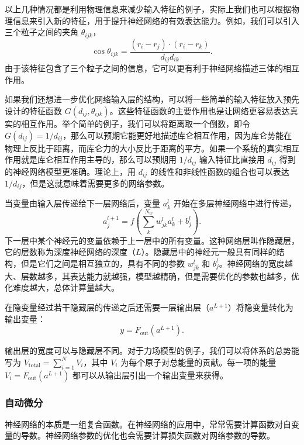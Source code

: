 以上几种情况都是利用物理信息来减少输入特征的例子，实际上我们也可以根据物理信息来引入新的特征，用于提升神经网络的有效表达能力。例如，我们可以引入三个粒子之间的夹角 $\theta_{ijk}$，
\[
\cos\theta_{ijk}=\frac{(r_i-r_j)\cdot(r_i-r_k)}{d_{ij}d_{ik}}.
\]
由于该特征包含了三个粒子之间的信息，它可以更有利于神经网络描述三体的相互作用。

如果我们还想进一步优化网络输入层的结构，可以将一些简单的输入特征放入预先设计的特征函数 $G(d_{ij},\theta_{ijk})$。这些特征函数的主要作用也是让网络更容易表达真实的相互作用。举个简单的例子，我们可以将距离取一个倒数，即令 $G(d_{ij})=1/d_{ij}$，那么可以预期它能更好地描述库仑相互作用，因为库仑势能在物理上反比于距离，而库仑力的大小反比于距离的平方。如果一个系统的真实相互作用就是库仑相互作用主导的，那么可以预期用 $1/d_{ij}$ 输入特征比直接用 $d_{ij}$ 得到的神经网络模型更准确。理论上，用 $d_{ij}$ 的线性和非线性函数的组合也可以表达 $1/d_{ij}$，但是这就意味着需要更多的网络参数。

当变量由输入层传递给下一层网络后，变量 $a_k^l$ 开始在多层神经网络中进行传递，
\begin{equation}
a_j^{l+1}=f\left(\sum_k^{N_w}w_{jk}^{l}a_k^l+b_j^l\right).
\tag{8.3.5}
\end{equation}
下一层中某个神经元的变量依赖于上一层中的所有变量。这种网络层叫作隐藏层，它的层数称为深度神经网络的深度（$L$）。隐藏层中的神经元一般具有同样的结构，但是它们之间是相互独立的，具有不同的参数 $w_{jk}^l$ 和 $b_j^l$。神经网络的宽度越大、层数越多，其表达能力就越强，模型越精确，但是需要优化的参数也越多，优化难度越大，总体计算量越大。

在隐变量经过若干隐藏层的传递之后还需要一层输出层（$a^{L+1}$）将隐变量转化为输出变量：
\begin{equation}
y=F_{\mathrm{out}}(a^{L+1}).
\tag{8.3.6}
\end{equation}

输出层的宽度可以与隐藏层不同。对于力场模型的例子，我们可以将体系的总势能写为 $V_{\mathrm{total}}=\sum_{i=1}^{N}V_i$，其中 $V_i$ 为每个原子对总能量的贡献。每一项的能量 $V_i=F_{\mathrm{out}}(a^{L+1})$ 都可以从输出层引出一个输出变量来获得。

\subsubsection{自动微分}
神经网络的本质是一组复合函数。在神经网络的应用中，常常需要计算函数对自变量的导数。神经网络参数的优化也会需要计算损失函数对网络参数的导数。

